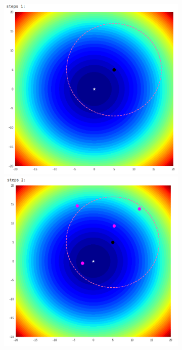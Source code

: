 \documentclass{book}
\begin{document}
\begin{itemize}
\begin{figure}[H]
\begin{figure}[H]
\begin{minipage}[c]{0.3\textwidth}
                \includegraphics[width=\textwidth]{images/one_plus_lambda_ex_step_1.png}
            \end{minipage}
            \begin{minipage}[c]{0.3\textwidth}
                \centering
                \includegraphics[width=\textwidth]{images/one_plus_lambda_ex_step_2.png}

\end{minipage}
\end{figure}
\end{figure}
\end{itemize}
\end{document}
